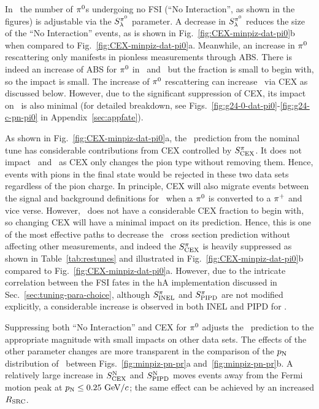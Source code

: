 In \minpiz\, the number of $\pi^0$s undergoing no FSI (``No Interaction'', as shown in the figures) is adjustable via the $S_\lambda^{\pi^{0}}$ parameter. A decrease in $S_\lambda^{\pi^{0}}$ reduces the size of the ``No Interaction'' events,  as is shown in Fig.~\ref{fig:CEX-minpiz-dat-pi0}b when compared to Fig.~\ref{fig:CEX-minpiz-dat-pi0}a. Meanwhile, an increase in $\pi^0$ rescattering only manifests in pionless measurements through ABS. There is indeed an increase of ABS for $\pi^0$ in \ttkzpi\ and \minzpi\, but the fraction is small to begin with, so the impact is small. The increase of $\pi^0$ rescattering can increase \ttkpip\ via CEX as discussed below. However, due to the significant suppression of CEX, its impact on \ttkpip\ is also minimal (for detailed breakdown, see Figs.~\ref{fig:g24-0-dat-pi0}-\ref{fig:g24-c-pn-pi0} in Appendix~\ref{sec:appfate}). 

As shown in Fig.~\ref{fig:CEX-minpiz-dat-pi0}a, the \minpiz\ prediction from the nominal tune has considerable contributions from CEX controlled by $S_\textrm{CEX}^{\pi}$. It does not impact \ttkzpi\ and \minzpi\ as CEX only changes the pion type without removing them. Hence, events with pions in the final state would be rejected in these two data sets regardless of the pion charge. In principle, CEX will also migrate events between the signal and background definitions for \ttkpip\ when a $\pi^0$ is converted to a $\pi^+$ and vice verse. However, \ttkpip\ does not have a considerable CEX fraction to begin with, so changing CEX will have a minimal impact on its prediction. Hence, this is one of the most effective paths to decrease the \minpiz\ cross section prediction without affecting other measurements, and indeed the $S_\textrm{CEX}^{\pi}$ is heavily suppressed as shown in Table~\ref{tab:restunes} and illustrated in Fig.~\ref{fig:CEX-minpiz-dat-pi0}b compared to Fig.~\ref{fig:CEX-minpiz-dat-pi0}a. However, due to the intricate correlation between the FSI fates in the hA implementation discussed in Sec.~\ref{sec:tuning-para-choice}, although $S_\textrm{INEL}^{\pi}$ and $S_\textrm{PIPD}^{\pi}$ are not modified explicitly, a considerable increase is observed in both INEL and PIPD for \minpiz. 

Suppressing both ``No Interaction'' and CEX for $\pi^0$ adjusts the \minpiz\ prediction to the appropriate magnitude with small impacts on other data sets.  The effects of the other parameter changes are more transparent in the comparison of the $p_\textrm{N}$ distribution of \minpiz\ between Figs.~\ref{fig:minpiz-pn-pr}a and~\ref{fig:minpiz-pn-pr}b. A relatively large increase in $S_\textrm{CEX}^\textrm{N}$ and $S_\textrm{PIPD}^\textrm{N}$ moves events away from the Fermi motion peak at $p_\textrm{N}\leq0.25~\textrm{GeV}/c$; the same effect can be achieved by an increased $R_\textrm{SRC}$. 

